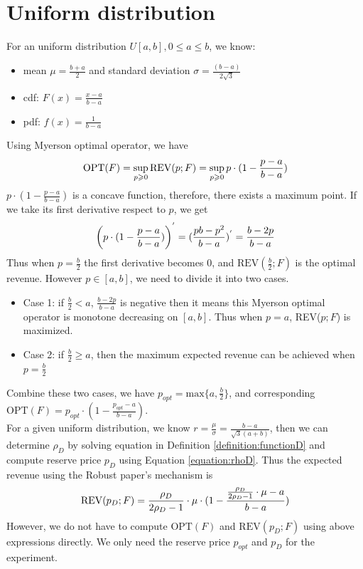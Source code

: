 \section{Uniform distribution}
For an uniform distribution $U[a,b], 0\leqslant a\leqslant b$, we know:
\begin{itemize}
	\item mean $\mu = \frac{b+a}{2}$ and standard deviation $\sigma = \frac{(b-a)}{2\sqrt{3}}$
	\item cdf: $F(x) = \frac {x-a}{b-a} $ 
	\item pdf: $f(x) = \frac{1}{b-a}$
\end{itemize}
Using Myerson optimal operator, we have
\begin{equation}\notag
\text{OPT}(F) = \sup_{p \geqslant 0}  \text{REV}(p;F) = \sup_{p \geqslant 0}  p \cdot (1-\frac {p-a}{b-a}) 
\end{equation}
$p \cdot (1-\frac {p-a}{b-a})$ is a concave function, therefore, there exists a maximum point. If we take its first derivative respect to $p$, we get
\begin{equation}\notag
	\left(p \cdot (1-\frac {p-a}{b-a})\right)^{'}  = (\frac {pb-p^2}{b-a})^{'} = \frac {b-2p}{b-a} 
\end{equation}
Thus when $p =\frac{b}{2} $ the first derivative becomes 0, and $ \text{REV}(\frac{b}{2};F)$ is the optimal revenue. However $p \in [a, b]$, we need to divide it into two cases.
\begin{itemize}
	\item Case 1: if $\frac{b}{2} < a$, $\frac {b-2p}{b-a}$ is negative then it means this Myerson optimal operator is monotone decreasing on $[a, b]$. Thus when $p = a$, REV($p;F$) is maximized. 
	\item Case 2: if $\frac{b}{2} \geqslant a $, then the maximum expected revenue can be achieved when $p = \frac{b}{2}$ 
\end{itemize}
Combine these two cases, we have $p_{opt} =\text{max} \{a, \frac{b}{2} \}$, and corresponding $\text{OPT}(F) =p_{opt} \cdot (1-\frac {p_{opt}-a}{b-a})$.\\
For a given uniform distribution, we know $r = \frac{\mu}{\sigma} = \frac {b-a}{\sqrt{3}(a+b)}$, then we can determine $\rho_{D}$ by solving equation in Definition \ref{definition:functionD} and compute reserve price $p_D$ using Equation \ref{equation:rhoD}. Thus the expected revenue using the Robust paper's mechanism is
\begin{equation}\notag
	\text{REV} (p_D;F) = \frac{\rho_{D}}{2\rho_{D}-1}\cdot \mu \cdot (1-\frac{\frac{\rho_{D}}{2\rho_{D}-1}\cdot \mu -a}{b-a})
\end{equation}
However, we do not have to compute $\text{OPT}(F)$ and $\text{REV}(p_D;F)$ using above expressions directly. We only need the reserve price $p_{opt}$ and $p_D$ for the experiment.
